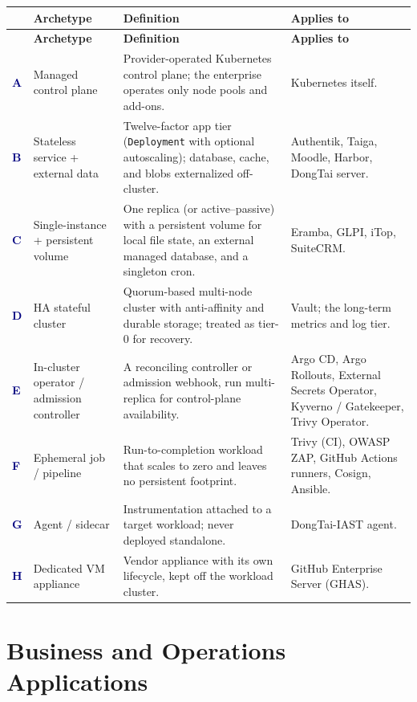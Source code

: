 \documentclass[10pt,letterpaper]{article}
\newcommand{\arch}[1]{\textcolor{Navy}{\textbf{#1}}}
\begin{document}
\begin{longtable}{L{0.55cm} L{3.6cm} L{6.2cm} L{4.3cm}}
\toprule
\textbf{} & \textbf{Archetype} & \textbf{Definition} & \textbf{Applies to} \\
\midrule
\endfirsthead
\toprule
\textbf{} & \textbf{Archetype} & \textbf{Definition} & \textbf{Applies to} \\
\midrule
\endhead
\bottomrule
\endfoot
\arch{A} & Managed control plane & Provider-operated Kubernetes control plane; the enterprise operates only node pools and add-ons. & Kubernetes itself. \\
\arch{B} & Stateless service + external data & Twelve-factor app tier (\texttt{Deployment} with optional autoscaling); database, cache, and blobs externalized off-cluster. & Authentik, Taiga, Moodle, Harbor, DongTai server. \\
\arch{C} & Single-instance + persistent volume & One replica (or active--passive) with a persistent volume for local file state, an external managed database, and a singleton cron. & Eramba, GLPI, iTop, SuiteCRM. \\
\arch{D} & HA stateful cluster & Quorum-based multi-node cluster with anti-affinity and durable storage; treated as tier-0 for recovery. & Vault; the long-term metrics and log tier. \\
\arch{E} & In-cluster operator / admission controller & A reconciling controller or admission webhook, run multi-replica for control-plane availability. & Argo CD, Argo Rollouts, External Secrets Operator, Kyverno / Gatekeeper, Trivy Operator. \\
\arch{F} & Ephemeral job / pipeline & Run-to-completion workload that scales to zero and leaves no persistent footprint. & Trivy (CI), OWASP ZAP, GitHub Actions runners, Cosign, Ansible. \\
\arch{G} & Agent / sidecar & Instrumentation attached to a target workload; never deployed standalone. & DongTai-IAST agent. \\
\arch{H} & Dedicated VM appliance & Vendor appliance with its own lifecycle, kept off the workload cluster. & GitHub Enterprise Server (GHAS). \\
\end{longtable}

\section{Business and Operations Applications}
\end{document}

